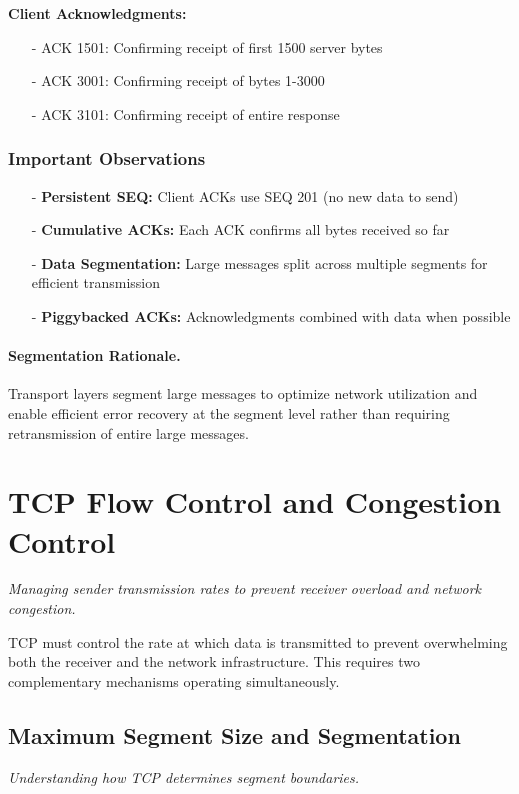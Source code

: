 \documentclass[../../compsys.tex]{subfiles}
\begin{document}
\textbf{Client Acknowledgments:}
\begin{itemize}
  \item[-] ACK 1501: Confirming receipt of first 1500 server bytes
  \item[-] ACK 3001: Confirming receipt of bytes 1-3000
  \item[-] ACK 3101: Confirming receipt of entire response
\end{itemize}

\subsubsection{Important Observations}
\begin{itemize}
  \item[-] \textbf{Persistent SEQ:} Client ACKs use SEQ 201 (no new data to send)
  \item[-] \textbf{Cumulative ACKs:} Each ACK confirms all bytes received so far
  \item[-] \textbf{Data Segmentation:} Large messages split across multiple segments for efficient transmission
  \item[-] \textbf{Piggybacked ACKs:} Acknowledgments combined with data when possible
\end{itemize}

\paragraph{Segmentation Rationale.} Transport layers segment large messages to optimize network utilization and enable efficient error recovery at the segment level rather than requiring retransmission of entire large messages.

\section{TCP Flow Control and Congestion Control}
\textit{Managing sender transmission rates to prevent receiver overload and network congestion.}

TCP must control the rate at which data is transmitted to prevent overwhelming both the receiver and the network infrastructure. This requires two complementary mechanisms operating simultaneously.

\subsection{Maximum Segment Size and Segmentation}
\textit{Understanding how TCP determines segment boundaries.}
\end{document}
